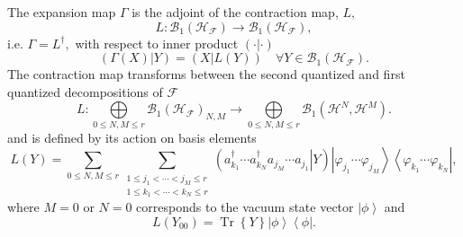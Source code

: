 \documentclass[aps,preprint]{revtex4}%
\begin{document}
The expansion map $\Gamma$ is the adjoint of the contraction map, $L,$
\cite{Kummar70}
\begin{equation}
L:\mathcal{B}_{1}\left(  \mathcal{H}_{\mathcal{F}}\right)  \rightarrow
\mathcal{B}_{1}\left(  \mathcal{H}_{\mathcal{F}}\right)  ,
\end{equation}
i.e. $\Gamma=L^{\dagger},$ with respect to inner product $\left(
\cdot\left\vert \cdot\right.  \right)  $
\begin{equation}
\left(  \Gamma\left(  X\right)  \left\vert Y\right.  \right)  =\left(
X\left\vert L\left(  Y\right)  \right.  \right)  \quad\forall Y\in
\mathcal{B}_{1}\left(  \mathcal{H}_{\mathcal{F}}\right)  .
\end{equation}
The contraction map transforms between the second quantized and first
quantized decompositions of $\mathcal{F}$
\begin{equation}
L:%
{\displaystyle\bigoplus\limits_{0\leq N,M\leq r}}
\mathcal{B}_{1}\left(  \mathcal{H}_{\mathcal{F}}\right)  _{N,M}\rightarrow%
{\displaystyle\bigoplus\limits_{0\leq N,M\leq r}}
\mathcal{B}_{1}\left(  \mathcal{H}^{N},\mathcal{H}^{M}\right)  .
\end{equation}
and is defined by its action on basis elements
\begin{equation}
L\left(  Y\right)  =\sum_{0\leq N,M\leq r}\sum_{\substack{1\leq j_{1}%
<\cdots<j_{M}\leq r\\1\leq k_{1}<\cdots<k_{N}\leq r}}\left(  \left.  a_{k_{1}%
}^{\dagger}\cdots a_{k_{N}}^{\dagger}a_{j_{M}}\cdots a_{j_{1}}\right\vert
Y\right)  \left\vert \varphi_{j_{1}}\cdots\varphi_{j_{M}}\right\rangle
\left\langle \varphi_{k_{1}}\cdots\varphi_{k_{N}}\right\vert ,
\end{equation}
where $M=0$ or $N=0$ corresponds to the vacuum state vector $\left\vert
\phi\right\rangle $ and
\begin{equation}
L\left(  Y_{00}\right)  =\operatorname*{Tr}\left\{  Y\right\}  \left\vert
\phi\right\rangle \left\langle \phi\right\vert .
\end{equation}
\end{document}
